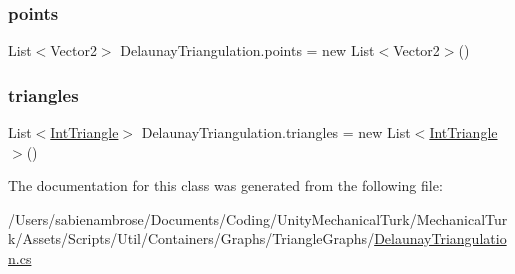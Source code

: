 \subsubsection{\texorpdfstring{points}{points}}
{\footnotesize\ttfamily List$<$Vector2$>$ Delaunay\+Triangulation.\+points = new List$<$Vector2$>$()\hspace{0.3cm}{\ttfamily [protected]}}

\mbox{\label{class_delaunay_triangulation_a51e3e7d9301274730cba64afc6ce69cb}} 
\subsubsection{\texorpdfstring{triangles}{triangles}}
{\footnotesize\ttfamily List$<$\mbox{\hyperlink{struct_int_triangle}{Int\+Triangle}}$>$ Delaunay\+Triangulation.\+triangles = new List$<$\mbox{\hyperlink{struct_int_triangle}{Int\+Triangle}}$>$()\hspace{0.3cm}{\ttfamily [protected]}}



The documentation for this class was generated from the following file\+:\begin{DoxyCompactItemize}
\item 
/\+Users/sabienambrose/\+Documents/\+Coding/\+Unity\+Mechanical\+Turk/\+Mechanical\+Turk/\+Assets/\+Scripts/\+Util/\+Containers/\+Graphs/\+Triangle\+Graphs/\mbox{\hyperlink{_delaunay_triangulation_8cs}{Delaunay\+Triangulation.\+cs}}\end{DoxyCompactItemize}

